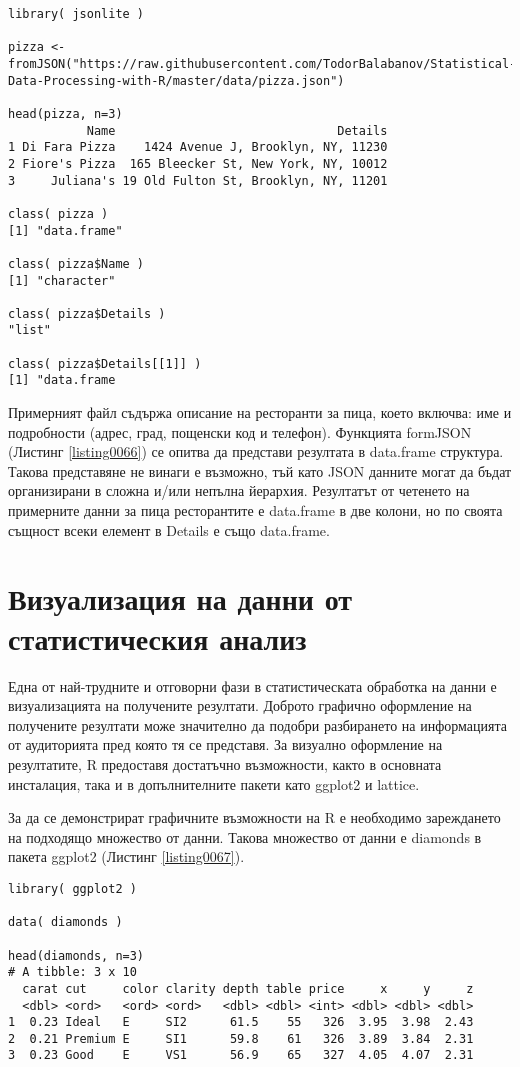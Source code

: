 \begin{lstlisting}[caption=Прочитане на JSON данни, label=listing0066]
library( jsonlite )
 
pizza <- fromJSON("https://raw.githubusercontent.com/TodorBalabanov/Statistical-Data-Processing-with-R/master/data/pizza.json")

head(pizza, n=3)
           Name                               Details
1 Di Fara Pizza    1424 Avenue J, Brooklyn, NY, 11230
2 Fiore's Pizza  165 Bleecker St, New York, NY, 10012
3     Juliana's 19 Old Fulton St, Brooklyn, NY, 11201

class( pizza )
[1] "data.frame"
 
class( pizza$Name )
[1] "character"
 
class( pizza$Details )
"list"

class( pizza$Details[[1]] )
[1] "data.frame
\end{lstlisting}

Примерният файл съдържа описание на ресторанти за пица, което включва: име и подробности (адрес, град, пощенски код и телефон). Функцията formJSON (Листинг \ref{listing0066}) се опитва да представи резултата в data.frame структура. Такова представяне не винаги е възможно, тъй като JSON данните могат да бъдат организирани в сложна и/или непълна йерархия. Резултатът от четенето на примерните данни за пица ресторантите е data.frame в две колони, но по своята същност всеки елемент в Details е също data.frame. 

\section{Визуализация на данни от статистическия анализ}

Една от най-трудните и отговорни фази в статистическата обработка на данни е визуализацията на получените резултати. Доброто графично оформление на получените резултати може значително да подобри разбирането на информацията от аудиторията пред която тя се представя. За визуално оформление на резултатите, R предоставя достатъчно възможности, както в основната инсталация, така и в допълнителните пакети като ggplot2 и lattice. 

За да се демонстрират графичните възможности на R е необходимо зареждането на подходящо множество от данни. Такова множество от данни е diamonds в пакета ggplot2 (Листинг \ref{listing0067}). 

\begin{lstlisting}[caption=Прочитане на JSON данни, label=listing0067]
library( ggplot2 )

data( diamonds )
 
head(diamonds, n=3)
# A tibble: 3 x 10
  carat cut     color clarity depth table price     x     y     z
  <dbl> <ord>   <ord> <ord>   <dbl> <dbl> <int> <dbl> <dbl> <dbl>
1  0.23 Ideal   E     SI2      61.5    55   326  3.95  3.98  2.43
2  0.21 Premium E     SI1      59.8    61   326  3.89  3.84  2.31
3  0.23 Good    E     VS1      56.9    65   327  4.05  4.07  2.31
\end{lstlisting}

